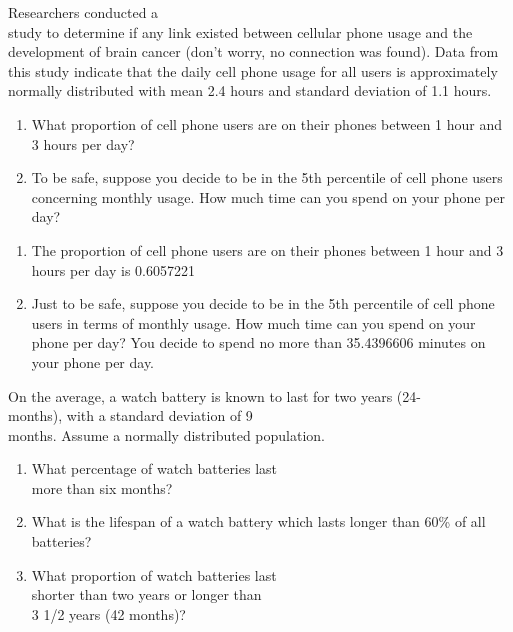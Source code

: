 \documentclass[11pt, chapterprefix=true]{scrbook}\usepackage[]{graphicx}\usepackage[]{color}
\begin{document}
\begin{exercises}
  \begin{exercise} %

Researchers conducted a \\ study to determine if any link existed between cellular phone usage and the development of brain cancer (don't worry, no connection was found).  Data from this study indicate that the daily cell phone usage for all users is approximately normally distributed with mean 2.4 hours and standard deviation of 1.1 hours.

	\begin{enumerate}
	\item What proportion of cell phone users are on their phones between 1 hour
and 3 hours per day?
  \item To be safe, suppose you decide to be in the 5th percentile of
cell phone users concerning monthly usage.  How much time can you spend on your phone per day?
	\end{enumerate}

	\end{exercise}
	\begin{solution}  %


\begin{enumerate}
	\item The proportion of cell phone users are on their phones between 1 hour
and 3 hours per day is 0.6057221
  \item Just to be safe, suppose you decide to be in the 5th percentile of
cell phone users in terms of monthly usage.  How much time can you spend on your phone per day? You decide to spend no more than 35.4396606 minutes on your phone per day.
	\end{enumerate}
	\end{solution}

  \begin{exercise} %

On the average, a watch battery is known to last for two years (24- \\ months), with a standard deviation of 9 \\ months. Assume a normally distributed population.

 \begin{enumerate}
	\item What percentage of watch batteries last \\ more than six months?
	\item What is the lifespan of a watch battery which lasts longer than 60\% of all batteries?
	\item What proportion of watch batteries last \\ shorter than two years or longer than \\ 3 1/2 years (42 months)?
 \end{enumerate}


\end{exercise}
\end{exercises}
\end{document}

